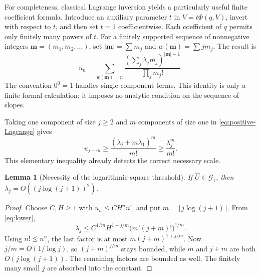 \documentclass[11pt,a4paper]{article}
\numberwithin{equation}{section}
\newtheorem{lemma}[theorem]{Lemma}
\theoremstyle{definition}
\theoremstyle{remark}
\newcommand{\U}{\widehat U}
\newcommand{\G}{\mathcal G_1}
\begin{document}
For completeness, classical Lagrange inversion \cite{gessel} yields a
particularly useful finite coefficient formula.  Introduce an auxiliary
parameter $t$ in $V=t\Phi(q,V)$, invert with respect to $t$, and then set
$t=1$ coefficientwise.  Each coefficient of $q$ permits only finitely many
powers of $t$.  For a finitely supported sequence of nonnegative integers
$\mathbf m=(m_1,m_2,\ldots)$, set
$|\mathbf m|=\sum m_j$ and $w(\mathbf m)=\sum jm_j$.  The result is
\begin{equation}
 u_n=\sum_{w(\mathbf m)=n}
       \frac{(\sum_j\lambda_jm_j)^{|\mathbf m|-1}}
            {\prod_jm_j!}.
 \label{eq:positive-Lagrange}
\end{equation}
The convention $0^0=1$ handles single-component terms.  This identity is
only a finite formal calculation; it imposes no analytic condition on
the sequence of slopes.

Taking one component of size $j\ge2$ and $m$ components of size one in
\eqref{eq:positive-Lagrange} gives
\begin{equation}
 u_{j+m}\ge \frac{(\lambda_j+m\lambda_1)^m}{m!}
             \ge\frac{\lambda_j^m}{m!}.
 \label{eq:lower}
\end{equation}
This elementary inequality already detects the correct necessary scale.

\begin{lemma}[Necessity of the logarithmic-square threshold]
\label{lem:necessary}
If $\U\in\G$, then $\lambda_j=O((j\log(j+1))^2)$.
\end{lemma}
\begin{proof}
Choose $C,H\ge1$ with $u_n\le CH^n n!$, and put
$m=\lceil j\log(j+1)\rceil$.  From \eqref{eq:lower},
\[
 \lambda_j\le C^{1/m}H^{1+j/m}
                   \bigl(m!(j+m)!\bigr)^{1/m}.
\]
Using $n!\le n^n$, the last factor is at most
$m(j+m)^{1+j/m}$.  Now $j/m=O(1/\log j)$, so
$(j+m)^{j/m}$ stays bounded, while $m$ and $j+m$ are both
$O(j\log(j+1))$.  The remaining factors are bounded as well.  The
finitely many small $j$ are absorbed into the constant.
\end{proof}
\end{document}
